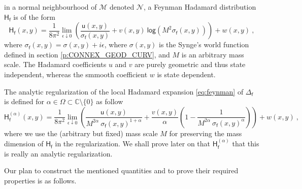 \documentclass[11pt]{book}
\renewcommand{\log}{\mathsf{log}}
\newcommand{\Mcal}{\mathcal{M}}
\newcommand{\Ncal}{\mathcal{N}}
\newcommand{\Cbb}{\mathbb{C}}
\newcommand{\Hsf}{\mathsf{H}}
\newcommand{\fsf}{\mathsf{f}}
\newcommand{\usf}{\mathsf{u}}
\theoremstyle{break}
\begin{document}
in a normal neighbourhood of $\Mcal$ denoted $\Ncal$, a Feynman Hadamard distribution $\Hsf_\fsf$ is of the form
%
\begin{equation}
\Hsf_\fsf(x,y) = \frac{1}{8\pi^2}  \lim_{\epsilon \downarrow 0} \left( \frac{\usf(x,y)}{\sigma_\fsf(x,y)} + v(x,y) \ \log\left( M^2 \sigma_\fsf(x,y)\right) \right) + w(x,y) \ ,
\label{eq:feynman} 
\end{equation}
%
where $\sigma_\fsf(x,y) = \sigma(x,y) + i \epsilon$, where $\sigma(x,y)$ is the Synge's world function defined in section \ref{p:CONNEX_GEOD_CURV}, and $M$ is an arbitrary mass scale. The Hadamard coefficients $u$ and $v$ are purely geometric and thus state independent, whereas the smmooth coefficient $w$ is state dependent.


The analytic regularization of the local Hadamard expansion \ref{eq:feynman} of $\Delta_\fsf$ is defined for $\alpha \in \Omega \subset \Cbb \setminus \{0\}$ as follow 
%
\begin{equation}
\Hsf^{(\alpha)}_\fsf(x,y) = \frac{1}{8\pi^2} \lim_{\epsilon \downarrow 0} \left( \frac{\usf(x,y)}{M^{2\alpha} \ \sigma_\fsf(x,y)^{1+\alpha}} + \frac{v(x,y)}{\alpha} \left( 1 - \frac{1}{ M^{2\alpha} \ \sigma_\fsf(x,y)^{\alpha} } \right) \right) + w(x,y) \ ,
\label{eq:feynman_reg}
\end{equation}
%
where we use the (arbitrary but fixed) mass scale $M$ for preserving the mass dimension of $\Hsf_\fsf$ in the regularization. We shall prove later on that $\Hsf^{(\alpha)}_\fsf$ that this is really an analytic regularization.


\bigskip


Our plan to construct the mentioned quantities and to prove their required properties is as follows.
\end{document}
